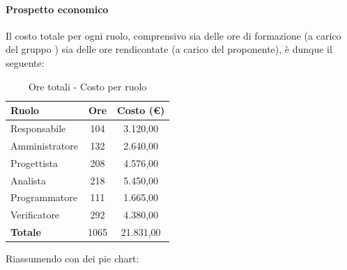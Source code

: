\documentclass[../PianoProgetto.tex]{subfiles}
\begin{document}
\vfill	
	
	\paragraph{Prospetto economico}
					Il costo totale per ogni ruolo, comprensivo sia delle ore di formazione (a carico del gruppo \leaf) sia delle ore rendicontate (a carico del proponente), è dunque il seguente:
	\begin{table}[h]
		\centering
		\begin{tabular}{l * {2}{c}}
			\toprule
			\textbf{Ruolo} & \textbf{Ore} & \textbf{Costo (\euro{})} \\
			\midrule
			Responsabile &	104 & 3.120,00 \\
			Amministratore & 132 & 2.640,00 \\
			Progettista & 208 & 4.576,00 \\
			Analista & 218 & 5.450,00 \\
			Programmatore & 111 & 1.665,00 \\
			Verificatore & 292 & 4.380,00 \\
			\midrule		
			\textbf{Totale} & 1065 &  21.831,00 \\
			\bottomrule
		\end{tabular}
		\caption{Ore totali - Costo per ruolo}
		\label{tab:totale_costo}
	\end{table}
\vfill
\newpage	
\vfill
	Riassumendo con dei pie chart:
\end{document}
